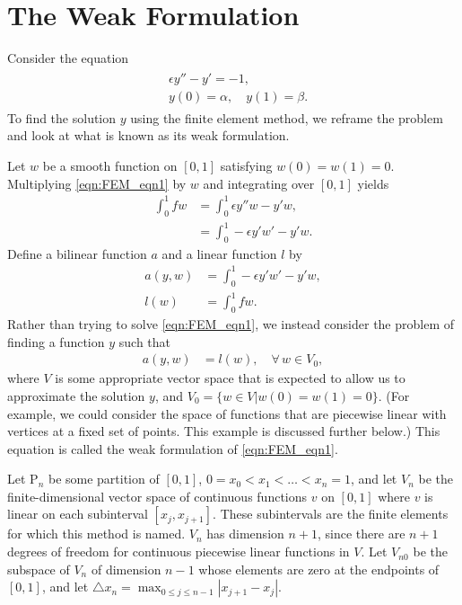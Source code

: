\section*{The Weak Formulation}
Consider the equation
\begin{align}
	\begin{split}
	&{ }\epsilon y'' - y' = -1,\\
	&{ }y(0) = \alpha, \quad y(1) = \beta .
	\end{split}\label{eqn:FEM_eqn1}
\end{align}
To find the solution $y$ using the finite element method, we reframe the problem and look at what is known as its weak formulation.

Let $w$ be a smooth function on $[0,1]$ satisfying $w(0) = w(1) = 0$.
Multiplying \eqref{eqn:FEM_eqn1} by $w$ and integrating over $[0,1]$ yields
\begin{align*}
	\int_0^1 f w &= \int_0^1 \epsilon y''w - y'w, \\
	&= \int_0^1 -\epsilon y'w' - y'w.
\end{align*}
Define a bilinear function $a$ and a linear function $l$ by
\begin{align*}
a(y,w) &= \int_0^1 -\epsilon y'w' - y'w,\\
l(w) &= \int_0^1 f w.
\end{align*}
Rather than trying to solve \eqref{eqn:FEM_eqn1}, we instead consider the problem of finding a function $y$ such that
\begin{align}
	a(y,w) &= l(w), \quad \forall \, w \in V_0,
	\label{eqn:FEM_integral_form}
\end{align}
where $V$ is some appropriate vector space that is expected to allow us to approximate the solution $y$, and $V_0 = \{w \in V|w(0) = w(1) = 0\}$.
(For example, we could consider the space of functions that are piecewise linear with vertices at a fixed set of points.
This example is discussed further below.)
This equation is called the weak formulation of \eqref{eqn:FEM_eqn1}.

Let $\mathrm{P}_n$ be some partition of $[0,1]$, $0 = x_0 < x_1< \ldots < x_{n} = 1$, and let $V_n$ be the finite-dimensional vector space of continuous functions $v$ on $[0,1]$ where $v$ is linear on each subinterval $[{x_j,x_{j+1}}]$.
These subintervals are the finite elements for which this method is named.
$V_n$ has dimension $n+1$, since there are $n+1$ degrees of freedom for continuous piecewise linear functions in $V$.
Let $V_{n0}$ be the subspace of $V_n$ of dimension $n-1$ whose elements are zero at the endpoints of $[0,1]$, and let $\triangle x_n = \max_{0 \leq j \leq n-1}|x_{j+1} - x_j|$.


